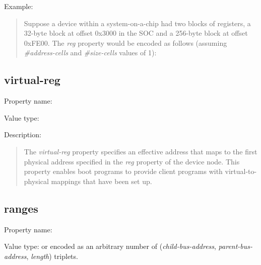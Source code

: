 \documentclass[a4paper,10pt,oneside]{sphinxmanual}
\begin{document}
Example:
\begin{quote}

Suppose a device within a system-on-a-chip had two blocks of registers, a
32-byte block at offset 0x3000 in the SOC and a 256-byte block at offset
0xFE00. The \emph{reg} property would be encoded as follows (assuming
\emph{\#address-cells} and \emph{\#size-cells} values of 1):
\begin{quote}

\end{quote}
\end{quote}


\subsection{virtual-reg}
\label{devicetree-basics:sect-standard-properties-virtual-reg}\label{devicetree-basics:virtual-reg}
Property name: 

Value type: 

Description:
\begin{quote}

The \emph{virtual-reg} property specifies an effective address that maps to
the first physical address specified in the \emph{reg} property of the device
node. This property enables boot programs to provide client programs
with virtual-to-physical mappings that have been set up.
\end{quote}


\subsection{ranges}
\label{devicetree-basics:ranges}\label{devicetree-basics:sect-standard-properties-ranges}
Property name: 

Value type:  or  encoded as an arbitrary number of
(\emph{child-bus-address}, \emph{parent-bus-address}, \emph{length}) triplets.
\end{document}
